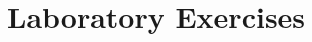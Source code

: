 \chapter{Laboratory Exercises}
\setlength{\headheight}{12.71342pt}
\addtolength{\topmargin}{-0.71342pt}

